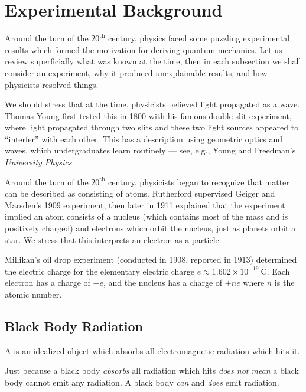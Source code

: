 \section{Experimental Background}

\M Around the turn of the $20^{\text{th}}$ century, physics faced some
puzzling experimental results which formed the motivation for deriving
quantum mechanics. Let us review superficially what was known at the
time, then in each subsection we shall consider an experiment, why it
produced unexplainable results, and how physicists resolved things.

\label{chunk:qm:experimental-background:status-of-light}
We should stress that at the time, physicists believed light propagated
as a wave. Thomas Young first tested this in 1800 with his famous
double-slit experiment, where light propagated through two slits and
these two light sources appeared to ``interfer'' with each other. This
has a description using geometric optics and waves, which undergraduates
learn routinely --- see, e.g., Young and Freedman's
\textit{University Physics}.

\label{chunk:qm:experimental-background:atomic-theory}
Around the turn of the $20^{\text{th}}$ century, physicists began to
recognize that matter can be described as consisting of
atoms. Rutherford supervised Geiger and Marsden's 1909 experiment, then
later in 1911 explained that the experiment implied an atom consists of
a nucleus (which contains most of the mass and is positively charged)
and electrons which orbit the nucleus, just as planets orbit a star. We
stress that this interprets an electron as a particle.

Millikan's oil drop experiment (conducted in 1908, reported in 1913)
determined the electric charge for the elementary electric charge
$e\approx1.602\times10^{-19}~\mathrm{C}$.  Each electron has a charge of
$-e$, and the nucleus has a charge of $+ne$ where $n$ is the atomic
number.

\subsection{Black Body Radiation}

\begin{definition}
A  is an idealized object which absorbs all electromagnetic
radiation which hits it.
\end{definition}

\begin{remark}
Just because a black body \emph{absorbs} all radiation which hits
\emph{does not mean} a black body cannot emit any radiation. A black
body \emph{can} and \emph{does} emit radiation.
\end{remark}

